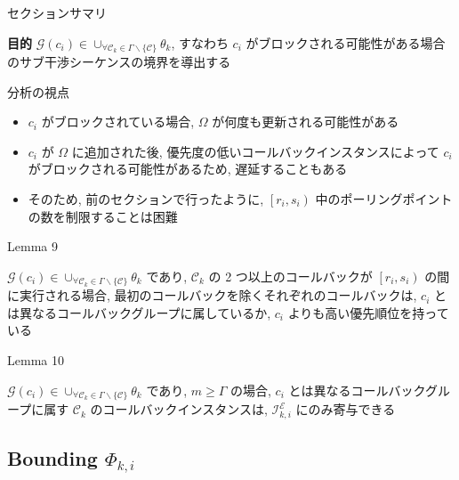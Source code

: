 \begin{frame}{セクションサマリ}
    \begin{itembox}[l]{\textbf{目的}}
        $\mathcal{G}\left(c_{i}\right) \in \cup_{\forall \mathcal{C}_{k} \in \Gamma \backslash\{\mathcal{C}\}} \theta_{k}$, すなわち $c_{i}$ がブロックされる可能性がある場合のサブ干渉シーケンスの境界を導出する
    \end{itembox}
\end{frame}

\begin{frame}{分析の視点}
    \begin{itemize}
        \item $c_{i}$ がブロックされている場合, $\Omega$ が何度も更新される可能性がある
        \item $c_{i}$ が $\Omega$ に追加された後, 優先度の低いコールバックインスタンスによって $c_{i}$ がブロックされる可能性があるため, 遅延することもある
        \item そのため, 前のセクションで行ったように, $\left[r_{i}, s_{i}\right)$ 中のポーリングポイントの数を制限することは困難
    \end{itemize}
\end{frame}

\begin{frame}[label=lemma9]{Lemma 9}
    \begin{lemma}[]
        $\mathcal{G}\left(c_{i}\right) \in \cup_{\forall \mathcal{C}_{k} \in \Gamma \backslash\{\mathcal{C}\}} \theta_{k}$ であり, $\mathcal{C}_{k}$ の 2 つ以上のコールバックが $\left[r_{i}, s_{i}\right)$ の間に実行される場合, 最初のコールバックを除くそれぞれのコールバックは, $c_{i}$ とは異なるコールバックグループに属しているか, $c_{i}$ よりも高い優先順位を持っている
    \end{lemma}
\end{frame}

\begin{frame}[label=lemma10]{Lemma 10}
    \begin{lemma}[]
        $\mathcal{G}\left(c_{i}\right) \in \cup_{\forall \mathcal{C}_{k} \in \Gamma \backslash\{\mathcal{C}\}} \theta_{k}$ であり, $m \geq \Gamma$ の場合, $c_{i}$ とは異なるコールバックグループに属す $\mathcal{C}_{k}$ のコールバックインスタンスは, $\mathcal{I}_{k, i}^{\mathcal{E}}$ にのみ寄与できる
    \end{lemma}
\end{frame}


\subsection{Bounding $\Phi_{k, i}$}
\label{ssec: bounding_phi}

